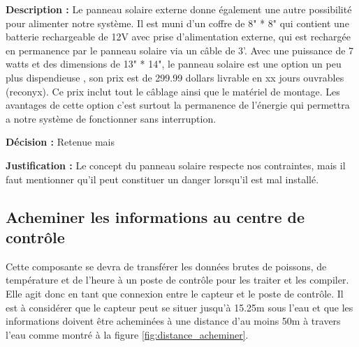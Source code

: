 \textbf{Description :}
Le panneau solaire externe donne également une autre possibilité pour alimenter notre système. Il est muni d'un coffre de 8" * 8" qui contient une batterie rechargeable de 12V avec prise d'alimentation externe, qui est rechargée en permanence par le panneau solaire via un câble de 3'. Avec une puissance de 7 watts et des dimensions de 13" * 14", le panneau solaire est une option un peu plus dispendieuse , son prix est de 299.99 dollars livrable en xx jours ouvrables (reconyx). Ce prix inclut tout le câblage ainsi que le matériel de montage. Les avantages de cette option c'est surtout la permanence de l'énergie qui permettra a notre système de fonctionner sans interruption.

\textbf{Décision :}
Retenue mais

\textbf{Justification :}
Le concept du panneau solaire respecte nos contraintes, mais il faut mentionner qu'il peut constituer un danger lorsqu'il est mal installé.

\begin{table}[!htb]
\footnotesize
\centering
{}
\caption{Évaluation globale des concepts pour l'alimentation du système}
\label{t:Decision_alimenter}
\end{table}

\subsection{Acheminer les informations au centre de contrôle}
Cette composante se devra de transférer les données brutes de poissons, de température et de l'heure à un poste de contrôle pour les traiter et les compiler. Elle agit donc en tant que connexion entre le capteur et le poste de contrôle. Il est à considérer que le capteur peut se situer jusqu'à 15.25m sous l'eau et que les informations doivent être acheminées à une distance d'au moins 50m à travers l'eau comme montré à la figure \ref{fig:distance_acheminer}.


